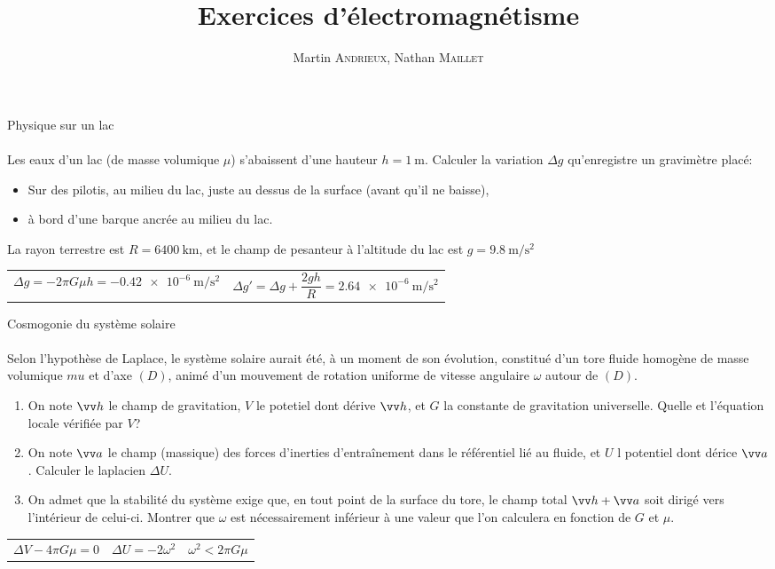 \documentclass[french, a4paper, 11pt]{article}
\title{Exercices d'électromagnétisme}
\author{Martin \textsc{Andrieux}, Nathan \textsc{Maillet}}
\date{}
\begin{document}
\maketitle

\begin{cadre}{Physique sur un lac}
  \paragraph*{}
  Les eaux d'un lac (de masse volumique \(\mu\)) s'abaissent d'une hauteur \(h=\SI{1}{\meter}\). Calculer la variation \(\Delta g\) qu'enregistre un gravimètre placé:
  \begin{itemize}[label=\(\bullet\)]
    \item Sur des pilotis, au milieu du lac, juste au dessus de la surface (avant qu'il ne baisse),
    \item à bord d'une barque ancrée au milieu du lac.
  \end{itemize}
  La rayon terrestre est \(R=\SI{6400}{\kilo\meter}\), et le champ de pesanteur à l'altitude du lac est \(g=\SI{9,8}{\meter\per\square\second}\)
  \tcblower
  \begin{tabularx}{\linewidth}{Xr}
    \(\Delta g = -2\pi G\mu h = \SI{-0.42e-6}{\meter\per\square\second}\)&
    \(\Delta g' = \Delta g + \dfrac{2gh}{R} = \SI{2.64e-6}{\meter\per\square\second}\)
  \end{tabularx}
\end{cadre}

\begin{cadre}{Cosmogonie du système solaire}
  \paragraph*{}
  Selon l'hypothèse de Laplace, le système solaire aurait été, à un moment de son évolution, constitué d'un tore fluide homogène de masse volumique \(mu\) et d'axe \((D)\), animé d'un mouvement de rotation uniforme de vitesse angulaire \(\omega\) autour de \((D)\).
  \begin{enumerate}[label=\upshape\alph*)]
    \item On note \(\vv h\) le champ de gravitation, \(V\) le potetiel dont dérive \(\vv h\), et \(G\) la constante de gravitation universelle. Quelle et l'équation locale vérifiée par \(V\)?
    \item On note \(\vv a\) le champ (massique) des forces d'inerties d'entraînement dans le référentiel lié au fluide, et \(U\) l potentiel dont dérice \(\vv a\). Calculer le laplacien \(\Delta U\).
    \item On admet que la stabilité du système exige que, en tout point de la surface du tore, le champ total \(\vv h + \vv a\) soit dirigé vers l'intérieur de celui-ci. Montrer que \(\omega\) est nécessairement inférieur à une valeur que l'on calculera en fonction de \(G\) et \(\mu\).
  \end{enumerate}
  \tcblower
  \begin{tabularx}{\linewidth}{XXr}
    \(\Delta V -4\pi G\mu = 0\) & \(\Delta U = -2\omega^{2}\) & \(\omega^{2} < 2\pi G \mu\)
  \end{tabularx}
\end{cadre}
\end{document}
